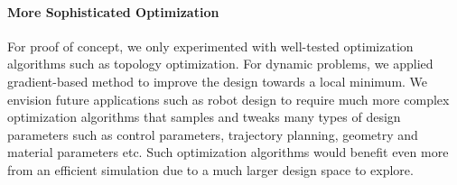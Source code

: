 \paragraph{More Sophisticated Optimization}
For proof of concept, we only experimented with well-tested optimization algorithms such as topology optimization. For dynamic problems, we applied gradient-based method to improve the design towards a local minimum.
We envision future applications such as robot design to require much more complex optimization algorithms that samples and tweaks many types of design parameters such as control parameters, trajectory planning, geometry and material parameters etc.
Such optimization algorithms would benefit even more from an efficient simulation due to a much larger design space to explore.
